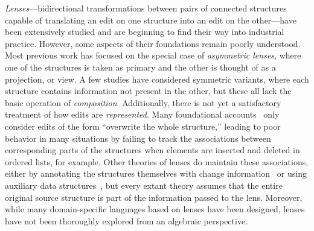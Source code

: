 \documentclass[12pt]{report}
\numberwithin{equation}{section}
\begin{document}
{\em Lenses}---bidirectional transformations between pairs of connected
structures capable of translating an edit on one structure into an edit on
the other---have been extensively studied and are beginning to find their
way into industrial practice. However, some aspects of their foundations
remain poorly understood. Most previous work has focused on the special case
of {\em asymmetric lenses}, where one of the structures is taken as primary
and the other is thought of as a projection, or view. A few studies have
considered symmetric variants, where each structure contains information not
present in the other, but these all lack the basic operation of {\em
composition}. Additionally, there is not yet a satisfactory treatment of how
edits are {\em represented}. Many foundational
accounts~\cite{Focal2005,HofmannPierceWagner10} only consider edits of the
form ``overwrite the whole structure,'' leading to poor behavior in many
situations by failing to track the associations between corresponding parts
of the structures when elements are inserted and deleted in ordered lists,
for example. Other theories of lenses do maintain these associations, either
by annotating the structures themselves with change
information~\cite{HuModels07, Hidaka10} or using auxiliary data
structures~\cite{Matching10, Diskin-Delta11}, but every extant theory
assumes that the entire original source structure is part of the information
passed to the lens. Moreover, while many domain-specific languages based on
lenses have been designed, lenses have not been thoroughly explored from an
algebraic perspective.
\end{document}
